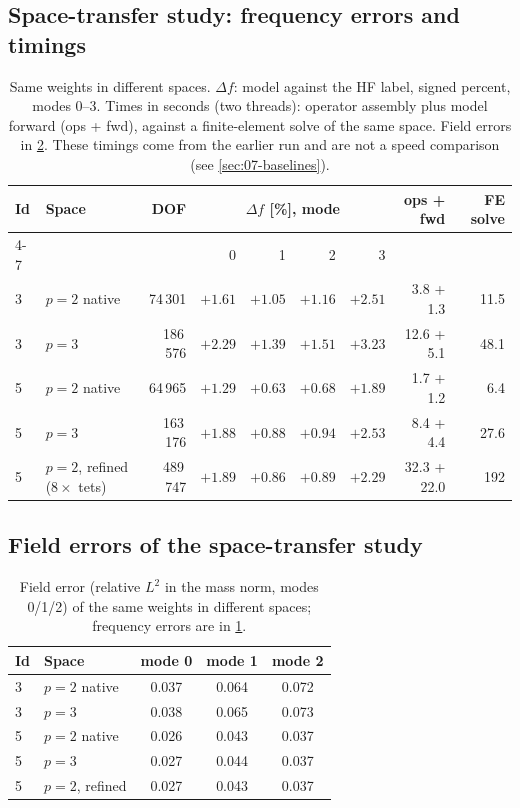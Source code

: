 \subsection{Space-transfer study: frequency errors and timings}\label{sec:A07-transfer-freq}
\begin{table}[t]
\centering\small
\caption{Same weights in different spaces. $\Delta f$: model against the HF label, signed percent, modes 0--3. Times in seconds (two threads): operator assembly plus model forward (ops + fwd), against a finite-element solve of the same space. Field errors in \cref{tab:A07-transfer-field}. These timings come from the earlier run and are not a speed comparison (see \cref{sec:07-baselines}).}
\label{tab:A07-transfer}
\setlength{\tabcolsep}{4pt}
\begin{tabular}{llrrrrrrr}
\toprule
Id & Space & DOF & \multicolumn{4}{c}{$\Delta f$ [\%], mode} & ops + fwd & FE solve\\
\cmidrule(lr){4-7}
 & & & 0 & 1 & 2 & 3 & & \\
\midrule
3 & $p{=}2$ native   & 74\,301  & $+1.61$ & $+1.05$ & $+1.16$ & $+2.51$ & 3.8 + 1.3  & 11.5\\
3 & $p{=}3$          & 186\,576 & $+2.29$ & $+1.39$ & $+1.51$ & $+3.23$ & 12.6 + 5.1 & 48.1\\
5 & $p{=}2$ native   & 64\,965  & $+1.29$ & $+0.63$ & $+0.68$ & $+1.89$ & 1.7 + 1.2  & 6.4\\
5 & $p{=}3$          & 163\,176 & $+1.88$ & $+0.88$ & $+0.94$ & $+2.53$ & 8.4 + 4.4  & 27.6\\
5 & $p{=}2$, refined ($8\times$ tets) & 489\,747 & $+1.89$ & $+0.86$ & $+0.89$ & $+2.29$ & 32.3 + 22.0 & 192\\
\bottomrule
\end{tabular}
\end{table}

\subsection{Field errors of the space-transfer study}\label{sec:A07-transfer}
\begin{table}[t]
\centering\small
\caption{Field error (relative $L^2$ in the mass norm, modes 0/1/2) of the same weights in different spaces; frequency errors are in \cref{tab:A07-transfer}.}
\label{tab:A07-transfer-field}
\begin{tabular}{llccc}
\toprule
Id & Space & mode 0 & mode 1 & mode 2\\
\midrule
3 & $p{=}2$ native & 0.037 & 0.064 & 0.072\\
3 & $p{=}3$ & 0.038 & 0.065 & 0.073\\
5 & $p{=}2$ native & 0.026 & 0.043 & 0.037\\
5 & $p{=}3$ & 0.027 & 0.044 & 0.037\\
5 & $p{=}2$, refined & 0.027 & 0.043 & 0.037\\
\bottomrule
\end{tabular}
\end{table}

